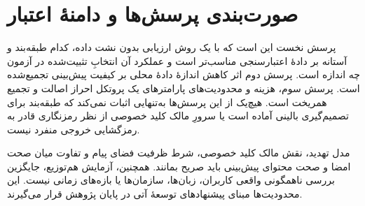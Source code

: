 

\section{صورت‌بندی پرسش‌ها و دامنۀ اعتبار}
پرسش نخست این است که با یک روش ارزیابی بدون نشت داده، کدام طبقه‌بند و آستانه بر دادۀ اعتبارسنجی مناسب‌تر است و عملکرد آن انتخابِ تثبیت‌شده در آزمون چه اندازه است. پرسش دوم اثر کاهش اندازۀ دادۀ محلی بر کیفیت پیش‌بینی تجمیع‌شده است. پرسش سوم، هزینه و محدودیت‌های پارامترهای یک پروتکل احراز اصالت و تجمیع همریخت است. هیچ‌یک از این پرسش‌ها به‌تنهایی اثبات نمی‌کند که طبقه‌بند برای تصمیم‌گیری بالینی آماده است یا سرورِ مالک کلید خصوصی از نظر رمزنگاری قادر به رمزگشایی خروجی منفرد نیست.

مدل تهدید، نقش مالک کلید خصوصی، شرط ظرفیت فضای پیام و تفاوت میان صحت امضا و صحت محتوای پیش‌بینی باید صریح بمانند. همچنین، آزمایش هم‌توزیع، جایگزین بررسی ناهمگونی واقعی کاربران، زبان‌ها، سازمان‌ها یا بازه‌های زمانی نیست. این محدودیت‌ها مبنای پیشنهادهای توسعۀ آتی در پایان پژوهش قرار می‌گیرند.
